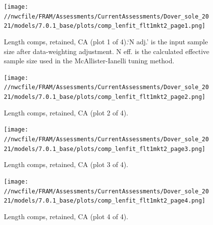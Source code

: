 \documentclass[11pt,
  english,
  a4paper,
]{article}
\begin{document}

\begin{figure}
\centering
\texttt{[image: //nwcfile/FRAM/Assessments/CurrentAssessments/Dover\_sole\_2021/models/7.0.1\_base/plots/comp\_lenfit\_flt1mkt2\_page1.png]}
\caption{Length comps, retained, CA (plot 1 of 4).`N adj.' is the input sample size after data-weighting adjustment. N eff. is the calculated effective sample size used in the McAllister-Ianelli tuning method.\label{fig:comp_lenfit_flt1mkt2_page1}}
\end{figure}

\tagmcend\tagstructend


\begin{figure}
\centering
\texttt{[image: //nwcfile/FRAM/Assessments/CurrentAssessments/Dover\_sole\_2021/models/7.0.1\_base/plots/comp\_lenfit\_flt1mkt2\_page2.png]}
\caption{Length comps, retained, CA (plot 2 of 4).\label{fig:comp_lenfit_flt1mkt2_page2}}
\end{figure}

\tagmcend\tagstructend


\begin{figure}
\centering
\texttt{[image: //nwcfile/FRAM/Assessments/CurrentAssessments/Dover\_sole\_2021/models/7.0.1\_base/plots/comp\_lenfit\_flt1mkt2\_page3.png]}
\caption{Length comps, retained, CA (plot 3 of 4).\label{fig:comp_lenfit_flt1mkt2_page3}}
\end{figure}

\tagmcend\tagstructend


\begin{figure}
\centering
\texttt{[image: //nwcfile/FRAM/Assessments/CurrentAssessments/Dover\_sole\_2021/models/7.0.1\_base/plots/comp\_lenfit\_flt1mkt2\_page4.png]}
\caption{Length comps, retained, CA (plot 4 of 4).\label{fig:comp_lenfit_flt1mkt2_page4}}
\end{figure}
\end{document}
